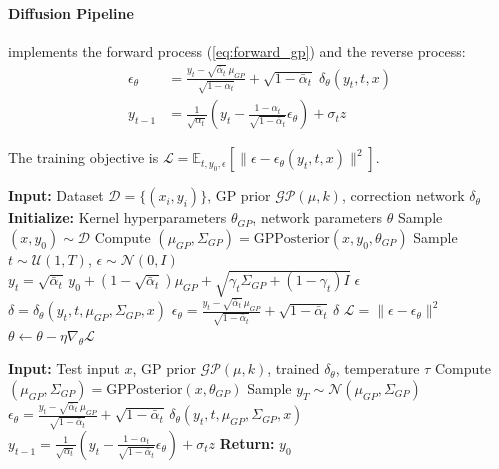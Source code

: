 \documentclass[conference]{IEEEtran}
\begin{document}
\paragraph{Diffusion Pipeline} implements the forward process (\ref{eq:forward_gp}) and the reverse process:
\begin{align}
\epsilon_\theta &= \frac{y_t - \sqrt{\bar{\alpha}_t}\, \mu_{GP}}{\sqrt{1 - \bar{\alpha}_t}} + \sqrt{1 - \bar{\alpha}_t}\; \delta_\theta(y_t, t, x) \\
y_{t-1} &= \frac{1}{\sqrt{\alpha_t}} \left( y_t - \frac{1 - \alpha_t}{\sqrt{1 - \bar{\alpha}_t}} \epsilon_\theta \right) + \sigma_t z
\end{align}

The training objective is $\mathcal{L} = \mathbb{E}_{t, y_0, \epsilon}[\|\epsilon - \epsilon_\theta(y_t, t, x)\|^2]$.

\begin{algorithm}[t]
\caption{GP-Diff Training Procedure}
\label{alg:training}
\begin{algorithmic}
\STATE \textbf{Input:} Dataset $\mathcal{D} = \{(x_i, y_i)\}$, GP prior $\mathcal{GP}(\mu, k)$, correction network $\delta_\theta$
\STATE \textbf{Initialize:} Kernel hyperparameters $\theta_{GP}$, network parameters $\theta$
\REPEAT
\STATE Sample $(x, y_0) \sim \mathcal{D}$
\STATE Compute $(\mu_{GP}, \Sigma_{GP}) = \text{GPPosterior}(x, y_0, \theta_{GP})$
\STATE Sample $t \sim \mathcal{U}(1, T)$, $\epsilon \sim \mathcal{N}(0, I)$
\STATE $y_t = \sqrt{\bar{\alpha}_t}\, y_0 + (1 - \sqrt{\bar{\alpha}_t})\mu_{GP} + \sqrt{\gamma_t \Sigma_{GP} + (1 - \gamma_t)I}\; \epsilon$
\STATE $\delta = \delta_\theta(y_t, t, \mu_{GP}, \Sigma_{GP}, x)$
\STATE $\epsilon_\theta = \frac{y_t - \sqrt{\bar{\alpha}_t}\,\mu_{GP}}{\sqrt{1 - \bar{\alpha}_t}} + \sqrt{1 - \bar{\alpha}_t}\, \delta$
\STATE $\mathcal{L} = \|\epsilon - \epsilon_\theta\|^2$
\STATE $\theta \leftarrow \theta - \eta \nabla_\theta \mathcal{L}$
\end{algorithmic}
\end{algorithm}

\begin{algorithm}[t]
\caption{GP-Diff Sampling Procedure}
\label{alg:sampling}
\begin{algorithmic}
\STATE \textbf{Input:} Test input $x$, GP prior $\mathcal{GP}(\mu, k)$, trained $\delta_\theta$, temperature $\tau$
\STATE Compute $(\mu_{GP}, \Sigma_{GP}) = \text{GPPosterior}(x, \theta_{GP})$
\STATE Sample $y_T \sim \mathcal{N}(\mu_{GP}, \Sigma_{GP})$
\STATE $\epsilon_\theta = \frac{y_t - \sqrt{\bar{\alpha}_t}\,\mu_{GP}}{\sqrt{1 - \bar{\alpha}_t}} + \sqrt{1 - \bar{\alpha}_t}\, \delta_\theta(y_t, t, \mu_{GP}, \Sigma_{GP}, x)$
\STATE $y_{t-1} = \frac{1}{\sqrt{\alpha_t}}(y_t - \frac{1 - \alpha_t}{\sqrt{1 - \bar{\alpha}_t}} \epsilon_\theta) + \sigma_t z$
\ENDFOR
\STATE \textbf{Return:} $y_0$
\end{algorithmic}
\end{algorithm}
\end{document}
